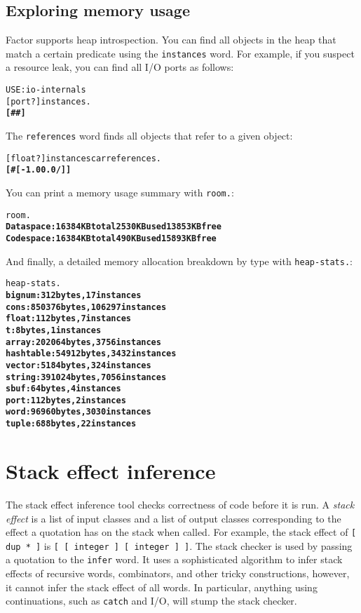 \documentclass{book}
\begin{document}
\section{Exploring memory usage}

Factor supports heap introspection. You can find all objects in the heap that match a certain predicate using the \texttt{instances} word. For example, if you suspect a resource leak, you can find all I/O ports as follows:

\begin{alltt}
  USE: io-internals
  [ port? ] instances .
\textbf{[ \#<port @ 805466443> \#<port @ 805466499> ]}
\end{alltt}

The \texttt{references} word finds all objects that refer to a given object:

\begin{alltt}
  [ float? ] instances car references .
\textbf{[ \#<array @ 805542171> [ -1.0 0.0 / ] ]}
\end{alltt}

You can print a memory usage summary with \texttt{room.}:

\begin{alltt}
  room.
\textbf{Data space: 16384 KB total 2530 KB used 13853 KB free
Code space: 16384 KB total 490 KB used 15893 KB free}
\end{alltt}

And finally, a detailed memory allocation breakdown by type with \texttt{heap-stats.}:

\begin{alltt}
  heap-stats.
\textbf{bignum: 312 bytes, 17 instances
cons: 850376 bytes, 106297 instances
float: 112 bytes, 7 instances
t: 8 bytes, 1 instances
array: 202064 bytes, 3756 instances
hashtable: 54912 bytes, 3432 instances
vector: 5184 bytes, 324 instances
string: 391024 bytes, 7056 instances
sbuf: 64 bytes, 4 instances
port: 112 bytes, 2 instances
word: 96960 bytes, 3030 instances
tuple: 688 bytes, 22 instances}
\end{alltt}

\chapter{Stack effect inference}

The stack effect inference tool checks correctness of code before it is run.
A \emph{stack effect} is a list of input classes and a list of output classes corresponding to
the effect a quotation has on the stack when called. For example, the stack effect of \verb|[ dup * ]| is \verb|[ [ integer ] [ integer ] ]|. The stack checker is used by passing a quotation to the \texttt{infer} word. It uses a sophisticated algorithm to infer stack effects of recursive words, combinators, and other tricky constructions, however, it cannot infer the stack effect of all words. In particular, anything using continuations, such as \texttt{catch} and I/O, will stump the stack checker.
\end{document}
